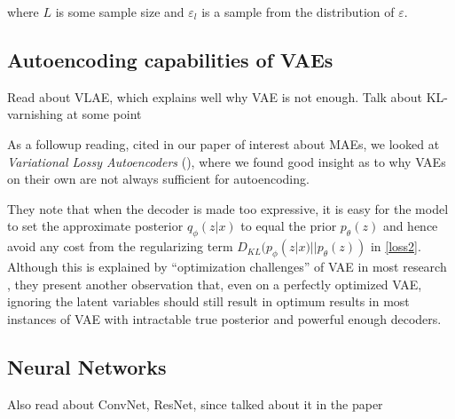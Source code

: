 \documentclass{article} %
\begin{document}
where $L$ is some sample size and $\varepsilon_l$ is a sample from the
distribution of $\varepsilon$.

%
%
%
%
%

\subsection {Autoencoding capabilities of VAEs}
Read about VLAE, which explains well why VAE is not enough. Talk about
KL-varnishing at some point

As a followup reading, cited in our paper of interest about MAEs, we looked at
\textit{Variational Lossy Autoencoders} (\citet{vlae}), where we found good
insight as to why VAEs on their own are not always sufficient for autoencoding.

They note that when the decoder is made too expressive, it is easy for the model
to set the approximate posterior $q_{\phi}(z|x)$ to equal the prior
$p_{\theta}(z)$ and hence avoid any cost from the regularizing term
$D_{KL}(p_\phi(z|x)||p_\theta(z))$ in \ref{loss2}. Although this is explained by
``optimization challenges'' of VAE in most research
, they present another observation that, even on a perfectly optimized VAE,
ignoring the latent variables should still result in optimum results in most
instances of VAE with intractable true posterior and powerful enough decoders.

\subsection {Neural Networks} %
Also read about ConvNet, ResNet, since talked about it in the paper
\end{document}
